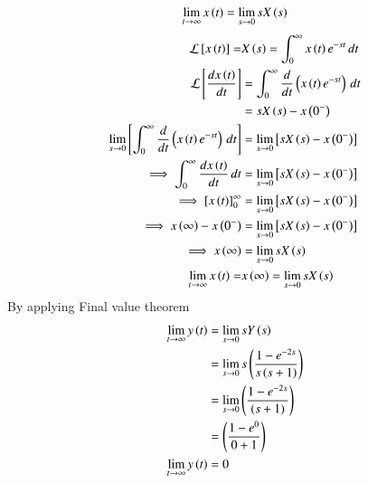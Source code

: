 \documentclass[a4,12pt,onecolumn]{IEEEtran}
\begin{document}
\begin{align}
\lim\limits_{t \to \infty} x\left(t\right) &= \lim\limits_{s \to 0} sX\left(s\right)\\
\end{align}
\begin{align}
\mathcal{L}\left[x\left(t\right)\right] = &X\left(s\right) = \int_{0}^{\infty} x\left(t\right)e^{-st} \, dt \\
\mathcal{L}\left[\frac{dx\left(t\right)}{dt}\right] &= \int_{0}^{\infty}\frac{d}{dt}\left(x\left(t\right)e^{-st}\right) \, dt \\
&= sX\left(s\right) - x\left(0^-\right)\\
 \lim\limits_{s \to 0}\left[ \int_{0}^{\infty}\frac{d}{dt}\left(x\left(t\right)e^{-st}\right) \, dt\right]&=\lim\limits_{s \to 0} \left[sX\left(s\right) - x\left(0^-\right)\right]\\
 \implies \int_{0}^{\infty}\frac{dx\left(t\right)}{dt} \, dt &= \lim\limits_{s \to 0}\left[sX\left(s\right) - x\left(0^-\right)\right]\\
 \implies \left[x\left(t\right) \right]_0^{\infty} &=\lim\limits_{s \to 0} \left[sX\left(s\right) - x\left(0^-\right)\right]\\
 \implies x\left(\infty\right)-x\left(0^-\right)&=\lim\limits_{s \to 0} \left[sX\left(s\right) - x\left(0^-\right)\right]\\
 \implies x\left(\infty\right)&=\lim\limits_{s \to 0} sX\left(s\right)\\
 \lim\limits_{t \to \infty} x\left(t\right) = & x\left(\infty\right) = \lim\limits_{s \to 0} sX\left(s\right)
\end{align}
By applying Final value theorem
\begin{align}
\lim\limits_{t \to \infty} y\left(t\right)&= \lim\limits_{s \to 0} sY\left(s\right)\\
&=\lim\limits_{s \to 0} s\left(\frac{1-e^{-2s}}{s\left(s+1\right)}\right)\\
&=\lim\limits_{s \to 0} \left(\frac{1-e^{-2s}}{\left(s+1\right)}\right)\\
&= \left(\frac{1-e^{0}}{0+1}\right)\\
\lim\limits_{t \to \infty} y\left(t\right) &= 0
\end{align}
\end{document}
